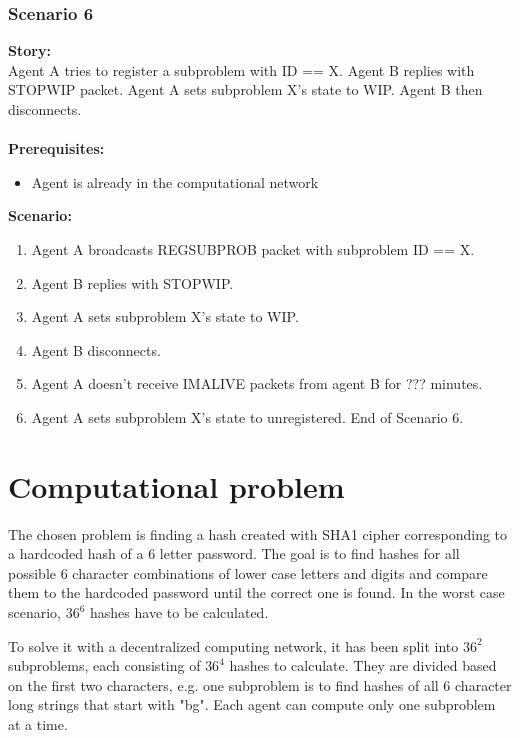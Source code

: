 \documentclass{article}
\begin{document}
\subsubsection{Scenario 6}
\noindent\textbf{Story:} \\
Agent A tries to register a subproblem with ID == X. Agent B replies with STOPWIP packet. Agent A sets subproblem X's state to WIP. Agent B then disconnects. \\\\
\textbf{Prerequisites:}
\begin{itemize}
    \item Agent is already in the computational network
\end{itemize}
\textbf{Scenario:}
\begin{enumerate}
    \item Agent A broadcasts REGSUBPROB packet with subproblem ID == X.
    \item Agent B replies with STOPWIP.
    \item Agent A sets subproblem X's state to WIP.
    \item Agent B disconnects.
    \item Agent A doesn't receive IMALIVE packets from agent B for ??? minutes.
    \item Agent A sets subproblem X's state to unregistered. End of Scenario 6.
\end{enumerate}

\section{Computational problem}
The chosen problem is finding a hash created with SHA1 cipher corresponding to a hardcoded hash of a 6 letter password.
The goal is to find hashes for all possible 6 character combinations of lower case letters and digits and compare them to the hardcoded password until the correct one is found.
In the worst case scenario, $36^6$ hashes have to be calculated.

To solve it with a decentralized computing network, it has been split into $36^2$ subproblems,
each consisting of $36^4$ hashes to calculate. They are divided based on the first two characters,
e.g. one subproblem is to find hashes of all 6 character long strings that start with "bg".
Each agent can compute only one subproblem at a time.
\end{document}
